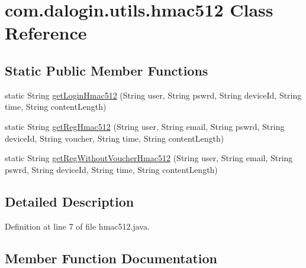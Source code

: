 \hypertarget{classcom_1_1dalogin_1_1utils_1_1hmac512}{}\section{com.\+dalogin.\+utils.\+hmac512 Class Reference}
\label{classcom_1_1dalogin_1_1utils_1_1hmac512}
\subsection*{Static Public Member Functions}
\begin{DoxyCompactItemize}
\item 
static String \hyperlink{classcom_1_1dalogin_1_1utils_1_1hmac512_a880350e2248aac785236093d48e5d95e}{get\+Login\+Hmac512} (String user, String pswrd, String device\+Id, String time, String content\+Length)
\item 
static String \hyperlink{classcom_1_1dalogin_1_1utils_1_1hmac512_a53ededd95b772a5a4f03820ff932fa18}{get\+Reg\+Hmac512} (String user, String email, String pswrd, String device\+Id, String voucher, String time, String content\+Length)
\item 
static String \hyperlink{classcom_1_1dalogin_1_1utils_1_1hmac512_af550a1d1245091d355b076a7194684cb}{get\+Reg\+Without\+Voucher\+Hmac512} (String user, String email, String pswrd, String device\+Id, String time, String content\+Length)
\end{DoxyCompactItemize}


\subsection{Detailed Description}


Definition at line 7 of file hmac512.\+java.



\subsection{Member Function Documentation}
\mbox{\label{classcom_1_1dalogin_1_1utils_1_1hmac512_a880350e2248aac785236093d48e5d95e}} 
